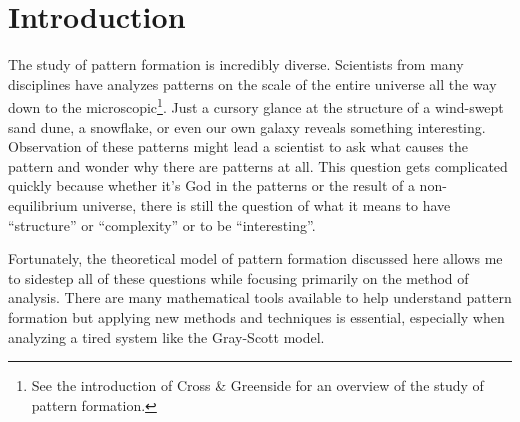 		
\chapter*{Introduction}

	The study of pattern formation is incredibly diverse. Scientists from many disciplines have analyzes patterns on the scale of the entire universe all the way down to the microscopic\footnote{See the introduction of Cross \& Greenside for an overview of the study of pattern formation.}. Just a cursory glance at the structure of a wind-swept sand dune, a snowflake, or even our own galaxy reveals something interesting. Observation of these patterns might lead a scientist to ask what causes the pattern and wonder why there are patterns at all. This question gets complicated quickly because whether it's God in the patterns or the result of a non-equilibrium universe, there is still the question of what it means to have ``structure'' or ``complexity'' or to be ``interesting''.
	
	Fortunately, the theoretical model of pattern formation discussed here allows me to sidestep all of these questions while focusing primarily on the method of analysis. There are many mathematical tools available to help understand pattern formation but applying new methods and techniques is essential, especially when analyzing a tired system like the Gray-Scott model.